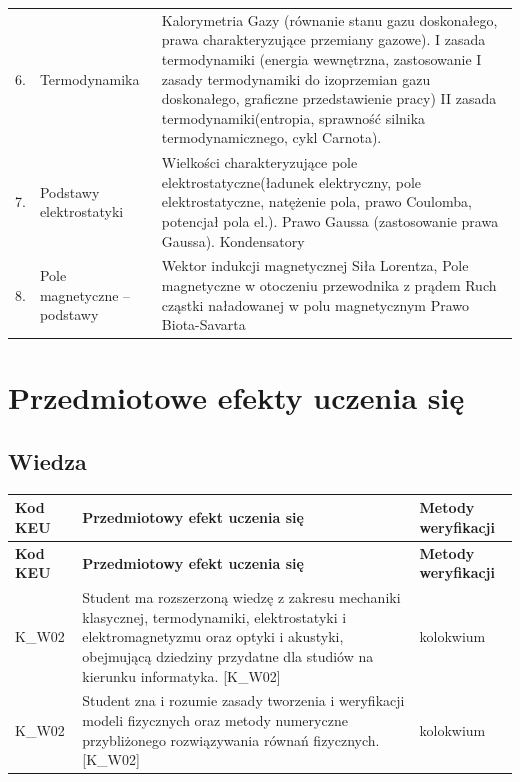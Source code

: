 \documentclass[12pt, a4paper]{article}
\newcommand{\thdrule}{\noalign{\global\setlength{\extrarowheight}{0pt}}}
\newcommand{\thdend}{\noalign{\global\setlength{\extrarowheight}{3pt}}}
\begin{document}
{\begin{longtable}{m{1.5cm}m{6.5cm}m{6.5cm}}
  \rowcolor{tableRowAlt} 6. & Termodynamika & Kalorymetria Gazy (równanie stanu gazu doskonałego, prawa charakteryzujące przemiany gazowe). I zasada termodynamiki (energia wewnętrzna, zastosowanie I zasady termodynamiki do izoprzemian gazu doskonałego, graficzne przedstawienie pracy) II zasada termodynamiki(entropia, sprawność silnika termodynamicznego, cykl Carnota). \\
  \rowcolor{tableRowLight} 7. & Podstawy elektrostatyki & Wielkości charakteryzujące pole elektrostatyczne(ładunek elektryczny, pole elektrostatyczne, natężenie pola, prawo Coulomba, potencjał pola el.). Prawo Gaussa (zastosowanie prawa Gaussa). Kondensatory \\
  \rowcolor{tableRowAlt} 8. & Pole magnetyczne – podstawy & Wektor indukcji magnetycznej Siła Lorentza, Pole magnetyczne w otoczeniu przewodnika z prądem Ruch cząstki naładowanej w polu magnetycznym Prawo Biota-Savarta \\
\bottomrule
\end{longtable}}

\section{Przedmiotowe efekty uczenia się}

\subsection*{Wiedza}
{\scriptsize
\begin{longtable}{m{1.6cm}m{9.0cm}m{4.2cm}}
\thdrule\toprule
\rowcolor{pjatkRed} {\color{white}\footnotesize\textbf{\vphantom{Ag}Kod KEU}} & {\color{white}\footnotesize\textbf{\vphantom{Ag}Przedmiotowy efekt uczenia się}} & {\color{white}\footnotesize\textbf{\vphantom{Ag}Metody weryfikacji}} \\
\midrule\thdend
\endfirsthead
\thdrule\toprule
\rowcolor{pjatkRed} {\color{white}\footnotesize\textbf{\vphantom{Ag}Kod KEU}} & {\color{white}\footnotesize\textbf{\vphantom{Ag}Przedmiotowy efekt uczenia się}} & {\color{white}\footnotesize\textbf{\vphantom{Ag}Metody weryfikacji}} \\
\midrule\thdend
\endhead
  \rowcolor{tableRowLight} K\_W02 & Student ma rozszerzoną wiedzę z zakresu mechaniki klasycznej, termodynamiki, elektrostatyki i elektromagnetyzmu oraz optyki i akustyki, obejmującą dziedziny przydatne dla studiów na kierunku informatyka. {[}K\_W02{]} & kolokwium \\
  \rowcolor{tableRowAlt} K\_W02 & Student zna i rozumie zasady tworzenia i weryfikacji modeli fizycznych oraz metody numeryczne przybliżonego rozwiązywania równań fizycznych. {[}K\_W02{]} & kolokwium \\
\bottomrule
\end{longtable}}
\end{document}
